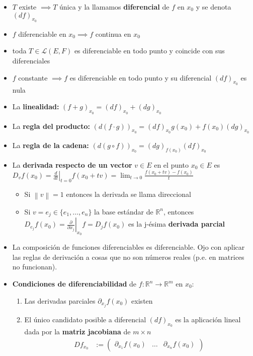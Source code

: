 \documentclass[a4paper,twocolumn]{extarticle}
\newcommand{\R}{\mathbb{R}}
\newcommand{\norma}[1]{\left\lVert#1\right\rVert}
\newcommand{\lacot}[1]{\mathcal{L}(#1)}
\begin{document}
\begin{itemize}
	\item $T$ existe $\implies T$ única y la llamamos \textbf{diferencial} de $f$ en $x_0$ y se denota $(df)_{x_0}$
	\item $f$ diferenciable en $x_0 \implies f$ continua en $x_0$
	\item toda $T \in \lacot{E,F}$ es diferenciable en todo punto y coincide con sus diferenciales
	\item $f$ constante $\implies f$ es diferenciable en todo punto y su diferencial $(df)_{x_0}$ es nula
	\item La \textbf{linealidad:} $(f + g)_{x_0} = (df)_{x_0} + (dg)_{x_0}$
	\item La \textbf{regla del producto:} $(d(f\cdot g))_{x_0} = (df)_{x_0}g(x_0) + f(x_0)(dg)_{x_0}$
	\item La \textbf{regla de la cadena:} $(d(g \circ f))_{x_0} = (dg)_{f(x_0)} (df)_{x_0}$
	\item La \textbf{derivada respecto de un vector} $v \in E$ en el punto $x_0 \in E$ es $D_vf(x_0) = \left.\frac{d}{dt}\right|_{t=0}f(x_0 + tv) = \lim_{t \to 0} \frac{f(x_0 + tv) - f(x_0)}{t}$
	\begin{itemize}
		\item Si $\norma{v} = 1$ entonces la derivada se llama direccional
		\item Si $v = e_j \in \{e_1, \dots, e_n\}$ la base estándar de $\R^n$, entonces $D_{e_j}f(x_0) = \left.\frac{\partial}{\partial x_j}\right|_{x_0}f = D_jf(x_0)$ es la j-ésima \textbf{derivada parcial}
	\end{itemize}
	\item La composición de funciones diferenciables es diferenciable. Ojo con aplicar las reglas de derivación a cosas que no son números reales (p.e. en matrices no funcionan).
	\item \textbf{Condiciones de diferenciabilidad} de $f:\R^n \to \R^m$ en $x_0$:
	\begin{enumerate}
		\item Las derivadas parciales $\partial_{x_j}f(x_0)$ existen
		\item El único candidato posible a diferencial $(df)_{x_0}$ es la aplicación lineal dada por la \textbf{matriz jacobiana} de $m \times n$
		\begin{align*}
			Df_{x_0} &:= \left(\begin{array}{c|c|c}
				\partial_{x_1}f(x_0) & \dots & \partial_{x_n}f(x_0)
			\end{array}\right)\\

\end{align*}
\end{enumerate}
\end{itemize}
\end{document}
